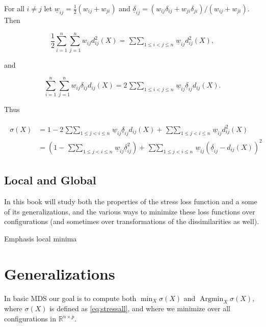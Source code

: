 \documentclass[
  12pt,
]{book}
\theoremstyle{definition}
\theoremstyle{definition}
\theoremstyle{definition}
\theoremstyle{definition}
\theoremstyle{remark}
\begin{document}
For all \(i\not= j\) let \(\underline{w}_{ij}=\frac12(w_{ij}+w_{ji})\) and
\(\underline{\delta}_{ij}=(w_{ij}\delta_{ij}+w_{ji}\delta_{ji})/(w_{ij}+w_{ji}).\)
Then

\begin{equation}
\frac12\sum_{i=1}^n\sum_{j=1}^nw_{ij}d_{ij}^2(X)=\mathop{\sum\sum}_{1\leq i<j\leq n}\underline{w}_{ij}d_{ij}^2(X),
\label{eq:emadsym}
\end{equation}

and

\begin{equation}
\sum_{i=1}^n\sum_{j=1}^nw_{ij}\delta_{ij}d_{ij}(X)=2\mathop{\sum\sum}_{1\leq i<j\leq n}\underline{w}_{ij}\underline{\delta}_{ij}d_{ij}(X).
\label{eq:rmadsym}
\end{equation}

Thus

\begin{align}
\begin{split}
\sigma(X)&=1-2\mathop{\sum\sum}_{1\leq j<i\leq n}\underline{w}_{ij}\underline{\delta}_{ij}d_{ij}(X)+\mathop{\sum\sum}_{1\leq j<i\leq n}\underline{w}_{ij}d_{ij}^2(X)\\&=(1-\mathop{\sum\sum}_{1\leq j<i\leq n}\underline{w}_{ij}\underline{\delta}_{ij}^2)+
\mathop{\sum\sum}_{1\leq j<i\leq n}\underline{w}_{ij}(\underline{\delta}_{ij}-d_{ij}(X))^2
\end{split}
\label{eq:smadsym}
\end{align}

\hypertarget{local-and-global}{%
\subsection{Local and Global}\label{local-and-global}}

In this book will study both the properties of the stress loss function
and a some of its generalizations, and the various ways to minimize these
loss functions over configurations (and sometimes over transformations of the
dissimilarities as well).

Emphasis local minima

\hypertarget{introgeneralize}{%
\section{Generalizations}\label{introgeneralize}}

In basic MDS our goal is to compute both \(\min_X\sigma(X)\) and \(\mathop{\text{Argmin}}_X\sigma(X)\), where \(\sigma(X)\) is defined as
\eqref{eq:stressall}, and where we minimize over all configurations in
\(\mathbb{R}^{n\times p}\).
\end{document}
